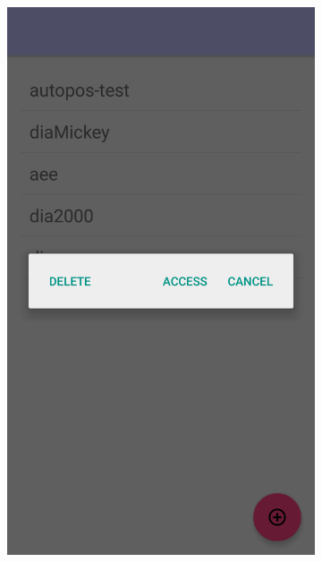 \begin{itemize}
\begin{figure}[!h]
\begin{subfigure}[t]{.3\textwidth}
				\includegraphics[width=\textwidth]{img/screen/colladia_workspaces_select}
			\end{subfigure}
			~
			\begin{subfigure}[t]{.3\textwidth}

\end{subfigure}
\end{figure}
\end{itemize}
